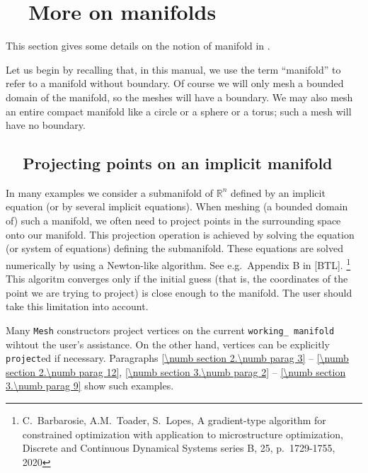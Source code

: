 
\chapter{~~More on manifolds}\label{\numb section 8}

This section gives some details on the notion of manifold in \maniFEM.

Let us begin by recalling that, in this manual, we use the term ``manifold'' to refer to
a manifold without boundary.
Of course we will only mesh a bounded domain of the manifold, so the meshes will have a boundary.
We may also mesh an entire compact manifold like a circle or a sphere or a torus;
such a mesh will have no boundary.


\section{~~Projecting points on an implicit manifold}\label{\numb section 8.\numb parag 1}

In many examples we consider a submanifold of $ \mathbb{R}^n $ defined by an implicit equation
(or by several implicit equations).
When meshing (a bounded domain of) such a manifold, we often need to project points in
the surrounding space onto our manifold. This projection operation is achieved by solving
the equation (or system of equations) defining the submanifold.
These equations are solved numerically by using a Newton-like algorithm.
See e.g.\ Appendix B in [BTL].%
\footnote{C.~Barbarosie, A.M.~Toader, S.~Lopes, A gradient-type algorithm for constrained
optimization with application to microstructure optimization, Discrete and Continuous Dynamical
Systems series B, 25, p.\ 1729-1755, 2020}
This algoritm converges only if the initial guess (that is, the coordinates of the point we are
trying to project) is close enough to the manifold.
The user should take this limitation into account.

Many {\small\tt Mesh} constructors project vertices on the current {\small\tt working\_\,manifold}
wihtout the user's assistance.
On the other hand, vertices can be explicitly {\small\tt project}ed if necessary.
Paragraphs \ref{\numb section 2.\numb parag 3} -- \ref{\numb section 2.\numb parag 12},
\ref{\numb section 3.\numb parag 2} -- \ref{\numb section 3.\numb parag 9} show such examples.
